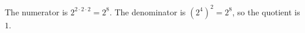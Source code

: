 The numerator is $2^{2\cdot2\cdot2}=2^8$. The denominator is $(2^4)^2=2^8$, so the quotient is $\boxed1$.
